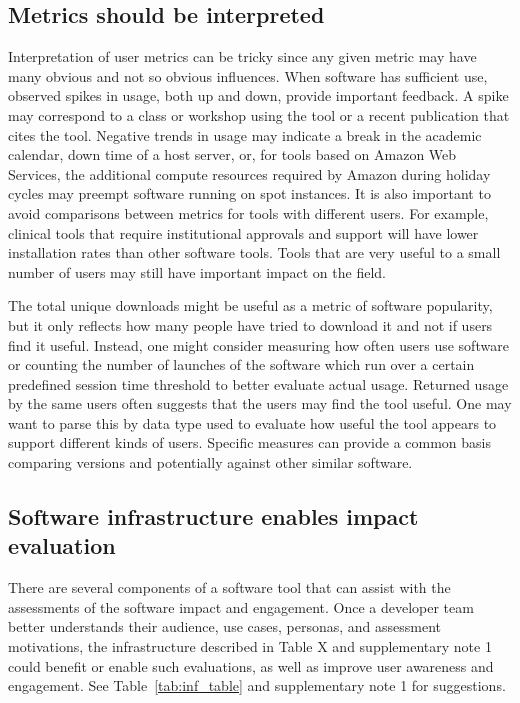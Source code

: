 \documentclass{article}
\begin{document}
 \subsection{Metrics should be interpreted}
 
 Interpretation of user metrics can be tricky since any given metric may have many obvious and not so obvious influences. When software has sufficient use, observed spikes in usage, both up and down, provide important feedback. A spike may correspond to a class or workshop using the tool or a recent publication that cites the tool. Negative trends in usage may indicate a break in the academic calendar, down time of a host server, or, for tools based on Amazon Web Services, the additional compute resources required by Amazon during holiday cycles may preempt software running on spot instances. It is also important to avoid comparisons between metrics for tools with different users. For example, clinical tools that require institutional approvals and support will have lower installation rates than other software tools. Tools that are very useful to a small number of users may still have important impact on the field.

The total unique downloads might be useful as a metric of software popularity, but it only reflects how many people have tried to download it and not if users find it useful. Instead, one might consider measuring how often users use software or  counting the number of launches of the software which run over a certain predefined session time threshold to better evaluate actual usage. Returned usage by the same users often suggests that the users may find the tool useful. One may want to parse this by data type used to evaluate how useful the tool appears to support different kinds of users.   Specific measures can provide a common basis comparing versions and potentially against other similar software.


\subsection{Software infrastructure enables impact evaluation}
There are several components of a software tool that can assist with the assessments of the software impact and engagement. Once a developer team better understands their audience, use cases, personas, and assessment motivations, the infrastructure described in Table X and supplementary note 1 could benefit or enable such evaluations, as well as improve user awareness and engagement. 
See Table~\ref{tab:inf_table} and supplementary note 1 for suggestions.
\end{document}
